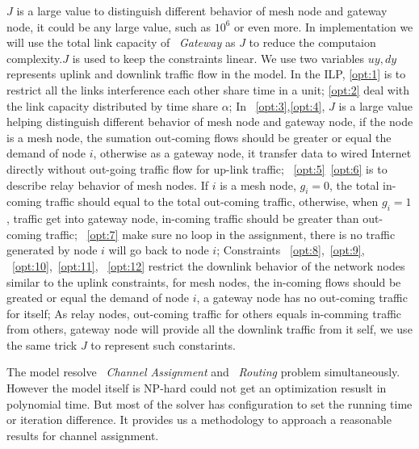 $J$ is a large value to distinguish different behavior of mesh node and gateway node, it could be any large value, such as $10^6$ or even more. In implementation we will use the total link capacity of ~\emph{Gateway} as $J$ to reduce the computaion complexity.$J$ is used to keep the constraints linear.
We use two variables $uy,dy$ represents uplink and downlink traffic flow in the model. 
In the ILP, \ref{opt:1} is to restrict all the links interference each other share time in a unit; \ref{opt:2} deal with the link capacity distributed by time share $\alpha$; 
In ~\ref{opt:3},\ref{opt:4}, $J$ is a large value helping distinguish different behavior of mesh node and gateway node, if the node is a mesh node, the sumation out-coming flows should be greater or equal the demand of node $i$, otherwise as a gateway node, it transfer data to wired Internet directly without out-going traffic flow for up-link traffic;
~\ref{opt:5}~\ref{opt:6} is to describe relay behavior of mesh nodes. If $i$ is a mesh node, $g_i=0$, the total in-coming traffic should equal to the total out-coming traffic, otherwise, when $g_i=1$, traffic get into gateway node, in-coming traffic should be greater than out-coming traffic;
~\ref{opt:7} make sure no loop in the assignment, there is no traffic generated by node $i$ will go back to node $i$;
Constraints ~\ref{opt:8},~\ref{opt:9}, 
~\ref{opt:10},~\ref{opt:11}, ~\ref{opt:12}
restrict the downlink behavior of the network nodes similar to the uplink constraints, for mesh nodes, the in-coming flows should be greated or equal the demand of node $i$, a gateway node has no out-coming traffic for itself; As relay nodes, out-coming traffic for others equals in-comming traffic from others, gateway node will provide all the downlink traffic from it self, we use the same trick $J$ to represent such constarints.

The model resolve ~\emph{Channel Assignment} and ~\emph{Routing} problem simultaneously. However the model itself is NP-hard could not get an optimization resuslt in polynomial time. But most of the solver has configuration to set the running time or iteration difference. It provides us a methodology to approach a reasonable results for channel assignment.

